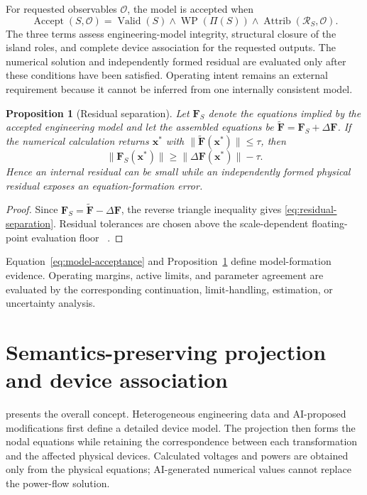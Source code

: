 \documentclass[final,5p,times,twocolumn]{elsarticle}
\newcommand{\Rmap}{\mathcal R}
\newcommand{\Proj}{\Pi}
\newcommand{\Accept}{\operatorname{Accept}}
\newcommand{\Valid}{\operatorname{Valid}}
\newcommand{\WP}{\operatorname{WP}}
\newcommand{\Attrib}{\operatorname{Attrib}}
\newtheorem{proposition}{Proposition}
\begin{document}
For requested observables $\mathcal O$, the model is accepted when
\begin{equation}
\Accept(S,\mathcal O)=\Valid(S)\wedge\WP(\Proj(S))
\wedge\Attrib(\Rmap_S,\mathcal O).
\label{eq:model-acceptance}
\end{equation}
The three terms assess engineering-model integrity, structural closure of the
island roles, and complete device association for the requested outputs. The
numerical solution and independently formed residual are evaluated only after
these conditions have been satisfied. Operating intent remains an external
requirement because it cannot be inferred from one internally consistent model.

\begin{proposition}[Residual separation]\label{prop:residual-separation}
Let $\bm F_S$ denote the equations implied by the accepted engineering model and
let the assembled equations be
$\widetilde{\bm F}=\bm F_S+\Delta\bm F$. If the numerical calculation returns
$\bm x^*$ with $\|\widetilde{\bm F}(\bm x^*)\|\le\tau$, then
\begin{equation}
 \|\bm F_S(\bm x^*)\|
 \ge \|\Delta\bm F(\bm x^*)\|-\tau.
 \label{eq:residual-separation}
\end{equation}
Hence an internal residual can be small while an independently formed physical
residual exposes an equation-formation error.
\end{proposition}
\begin{proof}
Since $\bm F_S=\widetilde{\bm F}-\Delta\bm F$, the reverse triangle
inequality gives \eqref{eq:residual-separation}. Residual tolerances are chosen
above the scale-dependent floating-point evaluation floor
~\cite{higham2002accuracy}.
\end{proof}

Equation~\eqref{eq:model-acceptance} and
Proposition~\ref{prop:residual-separation} define model-formation evidence.
Operating margins, active limits, and parameter agreement are evaluated by the
corresponding continuation, limit-handling, estimation, or uncertainty analysis.

\section{Semantics-preserving projection and device association}\label{sec:projection}

 presents the overall concept. Heterogeneous engineering
data and AI-proposed modifications first define a detailed device model. The
projection then forms the nodal equations while retaining the correspondence
between each transformation and the affected physical devices. Calculated
voltages and powers are obtained only from the physical equations; AI-generated
numerical values cannot replace the power-flow solution.
\end{document}

